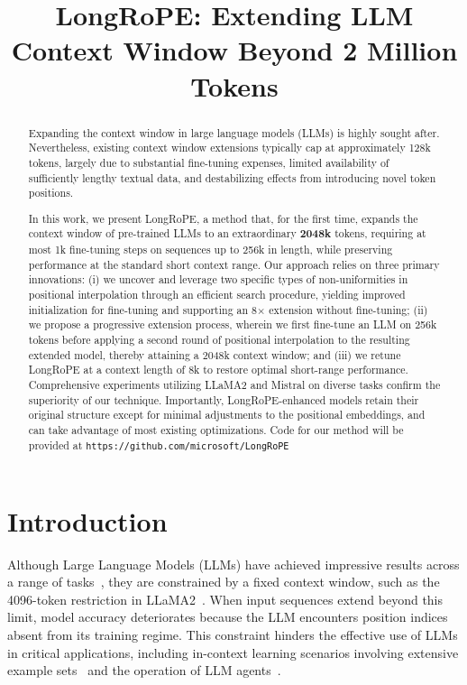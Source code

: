 \title{LongRoPE: Extending LLM Context Window Beyond 2 Million Tokens}

\begin{abstract}
Expanding the context window in large language models (LLMs) is highly sought after. Nevertheless, existing context window extensions typically cap at approximately 128k tokens, largely due to substantial fine-tuning expenses, limited availability of sufficiently lengthy textual data, and destabilizing effects from introducing novel token positions.

In this work, we present LongRoPE, a method that, for the first time, expands the context window of pre-trained LLMs to an extraordinary \textbf{2048k} tokens, requiring at most 1k fine-tuning steps on sequences up to 256k in length, while preserving performance at the standard short context range. Our approach relies on three primary innovations: (i) we uncover and leverage two specific types of non-uniformities in positional interpolation through an efficient search procedure, yielding improved initialization for fine-tuning and supporting an 8$\times$ extension without fine-tuning; (ii) we propose a progressive extension process, wherein we first fine-tune an LLM on 256k tokens before applying a second round of positional interpolation to the resulting extended model, thereby attaining a 2048k context window; and (iii) we retune LongRoPE at a context length of 8k to restore optimal short-range performance. Comprehensive experiments utilizing LLaMA2 and Mistral on diverse tasks confirm the superiority of our technique. Importantly, LongRoPE-enhanced models retain their original structure except for minimal adjustments to the positional embeddings, and can take advantage of most existing optimizations. Code for our method will be provided at \texttt{https://github.com/microsoft/LongRoPE}
\end{abstract}

\section{Introduction}

Although Large Language Models (LLMs) have achieved impressive results across a range of tasks~\cite{gpt4,llama2}, they are constrained by a fixed context window, such as the 4096-token restriction in LLaMA2~\cite{llama2}. When input sequences extend beyond this limit, model accuracy deteriorates because the LLM encounters position indices absent from its training regime. This constraint hinders the effective use of LLMs in critical applications, including in-context learning scenarios involving extensive example sets~\cite{Huang2023FewerIM} and the operation of LLM agents~\cite{park2023generative,madaan2023selfrefine}.

